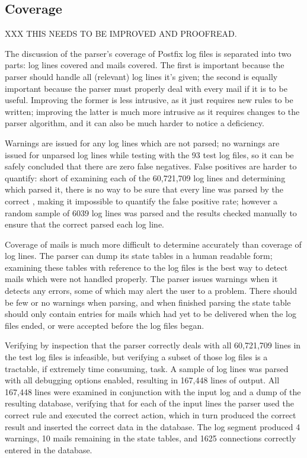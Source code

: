 \documentclass[draft]{svmult}
\newcommand{\numberOFlogFILES}[0]{%
    93%
}
\begin{document}
\subsection{Coverage}

\label{coverage}

XXX THIS NEEDS TO BE IMPROVED AND PROOFREAD\@.

The discussion of the parser's coverage of Postfix log files is separated
into two parts: log lines covered and mails covered.  The first is
important because the parser should handle all (relevant) log lines it's
given; the second is equally important because the parser must properly
deal with every mail if it is to be useful.  Improving the former is
less intrusive, as it just requires new rules to be written; improving the
latter is much more intrusive as it requires changes to the parser
algorithm, and it can also be much harder to notice a deficiency.

Warnings are issued for any log lines which are not parsed; no warnings are
issued for unparsed log lines while testing with the \numberOFlogFILES{}
test log files, so it can be safely concluded that there are zero false
negatives.  False positives are harder to quantify: short of examining each
of the 60,721,709 log lines and determining which \regex{} parsed it, there
is no way to be sure that every line was parsed by the correct \regex{},
making it impossible to quantify the false positive rate; however a random
sample of 6039 log lines was parsed and the results checked manually to
ensure that the correct \regex{} parsed each log line.

Coverage of mails is much more difficult to determine accurately than
coverage of log lines.  The parser can dump its state tables in a human
readable form; examining these tables with reference to the log files is
the best way to detect mails which were not handled properly.  The parser
issues warnings when it detects any errors, some of which may alert the
user to a problem.  There should be few or no warnings when parsing, and
when finished parsing the state table should only contain entries for mails
which had yet to be delivered when the log files ended, or were accepted
before the log files began.

Verifying by inspection that the parser correctly deals with all 60,721,709
lines in the test log files is infeasible, but verifying a subset of those
log files is a tractable, if extremely time consuming, task.  A sample of
log lines was parsed with all debugging options enabled, resulting in
167,448 lines of output.  All 167,448 lines were examined in conjunction
with the input log and a dump of the resulting database, verifying that for
each of the input lines the parser used the correct rule and executed the
correct action, which in turn produced the correct result and inserted the
correct data in the database.  The log segment produced 4 warnings, 10
mails remaining in the state tables, and 1625 connections correctly entered
in the database.
\end{document}
